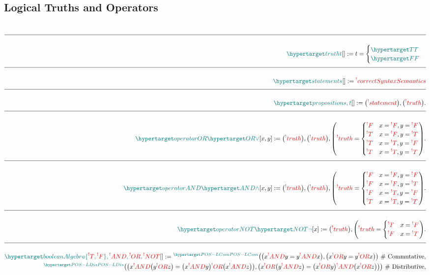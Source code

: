 \documentclass[a4paper]{article}
\makeatletter
\def\ml{\mleft}
\def\mr{\mright}
\newcommand{\defeq}{:=}
\newcommand{\cusand}{,}
\newcommand{\cuspop}{.}
\newcommand{\eqComment}[1]{\text{  \# #1}}
\newcommand{\n}{\\[1.5ex] \hline \nonumber \\[0ex]}
\newcommand{\m}{\nonumber \\}
\newcommand\rfrlist[1]{%
    \forcsvlist{\rfrlist@item}{#1}
}
\newcommand\rfrlist@item[1]{\rfr{#1}\\}
\newcommand{\thmlink}[2]{{}_{\substack{\rfrlist{#1}}}^{\dfn{#2}} }
\makeatother
\begin{document}
\subsection{Logical Truths and Operators}
\begin{tcolorbox}
\begin{align}
\n \dfn{truth} [t][] \defeq t = \begin{cases} \dfn{T} \\ \dfn{F} \end{cases} 
\n \dfn{statement} [s][] \defeq \rfr{correctSyntaxSemantics} [s][] 
\n \dfn{proposition} [s, t][] \defeq \ml(\rfr{statement} [s][]\mr) \cusand \ml(\rfr{truth} [t][]\mr) \cuspop
\n \dfn{operatorOR} [\dfn{OR}[\lor]][x, y] \defeq \ml(\rfr{truth} [x][]\mr) \cusand \ml(\rfr{truth} [y][]\mr) \cusand \ml(\rfr{truth} [x \rfr{OR} y][] = \begin{cases} \rfr{F} & x = \rfr{F} \cusand y = \rfr{F} \\ \rfr{T} & x = \rfr{F} \cusand y = \rfr{T} \\ \rfr{T} & x = \rfr{T} \cusand y = \rfr{F} \\ \rfr{T} & x = \rfr{T} \cusand y = \rfr{T} \end{cases}\mr) \cuspop
\n \dfn{operatorAND} [\dfn{AND}[\land]][x, y] \defeq \ml(\rfr{truth} [x][]\mr) \cusand \ml(\rfr{truth} [y][]\mr) \cusand \ml(\rfr{truth} [x \rfr{AND} y][] = \begin{cases} \rfr{F} & x = \rfr{F} \cusand y = \rfr{F} \\ \rfr{F} & x = \rfr{F} \cusand y = \rfr{T} \\ \rfr{F} & x = \rfr{T} \cusand y = \rfr{F} \\ \rfr{T} & x = \rfr{T} \cusand y = \rfr{T} \end{cases}\mr) \cuspop
\n \dfn{operatorNOT} [\dfn{NOT}[\lnot]][x] \defeq \ml(\rfr{truth} [x][]\mr) \cusand \ml(\rfr{truth} [\rfr{NOT} x][] = \begin{cases} \rfr{T} & x = \rfr{F} \\ \rfr{F} & x = \rfr{T} \end{cases}\mr) \cuspop 
\n \dfn{booleanAlgebra} [\{\rfr{T}, \rfr{F}\}, \rfr{AND}, \rfr{OR}, \rfr{NOT}][] \defeq \thmlink{}{POS-LCom} \ml(\ml(x \rfr{AND} y = y \rfr{AND} x\mr) \cusand \ml(x \rfr{OR} y = y \rfr{OR} x\mr)\mr) \eqComment{Commutative} \cusand
\m \thmlink{}{POS-LDis} \ml(\ml(x \rfr{AND} \ml(y \rfr{OR} z\mr) = \ml(x \rfr{AND} y\mr) \rfr{OR} \ml(x \rfr{AND} z\mr)\mr) \cusand \ml(x \rfr{OR} \ml(y \rfr{AND} z\mr) = \ml(x \rfr{OR} y\mr) \rfr{AND} \ml(x \rfr{OR} z\mr)\mr)\mr) \eqComment{Distributive} \cusand

\end{align}
\end{tcolorbox}
\end{document}
